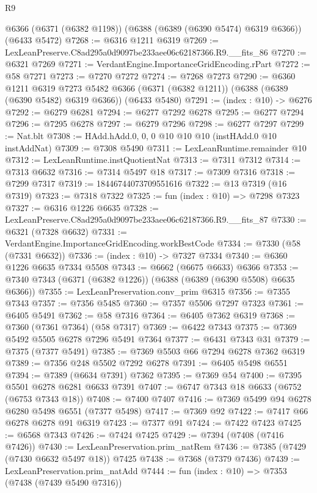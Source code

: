 \begin{lexlean}{R9}
\begin{coremodule}
    @6366
    (@6371 (@6382 @1198))
    (@6388 (@6389 (@6390 @5474) @6319 @6366))
    (@6433 @5472)
@7268 := @6316 @1211 @6319
@7269 := LexLeanPreserve.C8ad295a0d9097be233aee06c62187366.R9.__fits_86
@7270 := @6321 @7269
@7271 := VerdantEngine.ImportanceGridEncoding.rPart
@7272 := @58 @7271
@7273 := @7270 @7272
@7274 := @7268 @7273
@7290 := @6360
    @1211
    @6319
    @7273
    @5482
    @6366
    (@6371 (@6382 @1211))
    (@6388 (@6389 (@6390 @5482) @6319 @6366))
    (@6433 @5480)
@7291 := (index : @10) -> @6276
@7292 := @6279 @6281
@7294 := @6277 @7292 @6278
@7295 := @6277 @7294
@7296 := @7295 @6278
@7297 := @6279 @7296
@7298 := @6277 @7297
@7299 := Nat.blt
@7308 := HAdd.hAdd.{0, 0, 0} @10 @10 @10 (instHAdd.{0} @10 instAddNat)
@7309 := @7308 @5490
@7311 := LexLeanRuntime.remainder @10
@7312 := LexLeanRuntime.instQuotientNat
@7313 := @7311 @7312
@7314 := @7313 @6632
@7316 := @7314 @5497 @18
@7317 := @7309 @7316
@7318 := @7299 @7317
@7319 := 18446744073709551616
@7322 := @13 @7319 (@16 @7319)
@7323 := @7318 @7322
@7325 := fun (index : @10) => @7298 @7323
@7327 := @6316 @1226 @6635
@7328 := LexLeanPreserve.C8ad295a0d9097be233aee06c62187366.R9.__fits_87
@7330 := @6321 (@7328 @6632)
@7331 := VerdantEngine.ImportanceGridEncoding.workBestCode
@7334 := @7330 (@58 (@7331 @6632))
@7336 := (index : @10) -> @7327 @7334
@7340 := @6360 @1226 @6635 @7334 @5508
@7343 := @6662 (@6675 @6633) @6366
@7353 := @7340 @7343 (@6371 (@6382 @1226)) (@6388 (@6389 (@6390 @5508) @6635 @6366))
@7355 := LexLeanPreservation.conv_prim @6315
@7356 := @7355 @7343
@7357 := @7356 @5485
@7360 := @7357 @5506 @7297 @7323
@7361 := @6405 @5491
@7362 := @58 @7316
@7364 := @6405 @7362 @6319
@7368 := @7360 (@7361 @7364) (@58 @7317)
@7369 := @6422 @7343
@7375 := @7369 @5492 @5505 @6278 @7296 @5491 @7364
@7377 := @6431 @7343 @31
@7379 := @7375 (@7377 @5491)
@7385 := @7369 @5503 @66 @7294 @6278 @7362 @6319
@7389 := @7356 @248 @5502 @7292 @6278
@7391 := @6405 @5498 @6551
@7394 := @7389 (@6634 @7391) @7362
@7395 := @7369 @54
@7400 := @7395 @5501 @6278 @6281 @6633 @7391
@7407 := @6747 @7343 @18 @6633 (@6752 (@6753 @7343 @18))
@7408 := @7400 @7407
@7416 := @7369 @5499 @94 @6278 @6280 @5498 @6551 (@7377 @5498)
@7417 := @7369 @92
@7422 := @7417 @66 @6278 @6278 @91 @6319
@7423 := @7377 @91
@7424 := @7422 @7423
@7425 := @6568 @7343
@7426 := @7424 @7425
@7429 := @7394 (@7408 (@7416 @7426))
@7430 := LexLeanPreservation.prim_natRem
@7436 := @7385 (@7429 (@7430 @6632 @5497 @18)) @7425
@7438 := @7368 (@7379 @7436)
@7439 := LexLeanPreservation.prim_natAdd
@7444 := fun (index : @10) => @7353 (@7438 (@7439 @5490 @7316))

\end{coremodule}
\end{lexlean}
